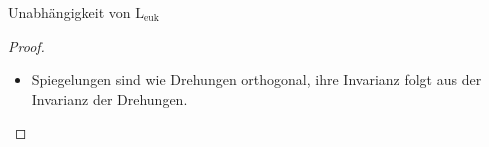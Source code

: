 \begin{lemma}{Unabhängigkeit von $ \text{L}_\text{euk} $}
\begin{proof}
\begin{enumerate}
\begin{itemize}
\begin{align*}
          D_\theta \circ c(t) &= \begin{pmatrix}
            \cos\theta & -\sin\theta \\
            \sin\theta & \cos\theta
          \end{pmatrix}c(t) \\ 
           &= (\cos\theta x(t) - \sin\theta y(t), \sin\theta x(t) + \cos\theta y(t))
        \end{align*}
        die um Winkel $ \theta $ gedrehte Kurve. \\
        Da $ D_\theta $ eine orthogonale Abbildung ist, folgt
        \begin{equation*}
          (D_\theta \circ c(t))' = D_\theta * c'(t)
        \end{equation*}
        und damit
        \begin{equation*}
          \left\Vert (D_\theta \circ c(t))' \right\Vert = \left\Vert D_\theta * c' \right\Vert \overset{\text{orth.}}{=} \left\Vert c' \right\Vert
        \end{equation*}
        und damit gilt das Lemma für Drehungen. \qed
        \item Spiegelungen sind wie Drehungen orthogonal, ihre Invarianz folgt aus der Invarianz der Drehungen.
      \end{itemize}
    \end{enumerate}
  \end{proof}
\end{lemma}


